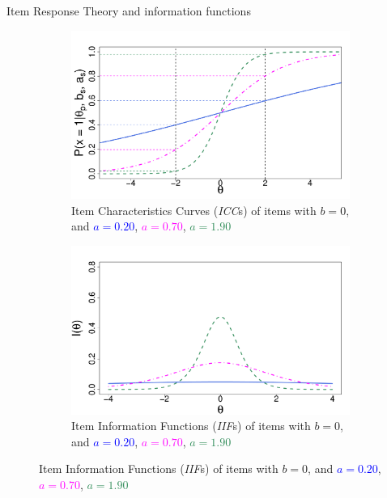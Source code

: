 \documentclass[final,t]{beamer}
\begin{document}
\begin{frame}
\begin{columns}[t]
\begin{column}{.45\linewidth}
\begin{block}{\centering Item Response Theory and information functions}
	\begin{figure}
		\centering
		\begin{subfigure}{.45\linewidth}
			\includegraphics[width=\linewidth]{img/bs.pdf}
			\caption{Item Characteristics Curves (\emph{ICC}s) of items with $b=0$, and \textcolor{blue}{$a = 0.20$}, \textcolor{magenta}{$a = 0.70$}, 
				\textcolor{seagreen}{$a = 1.90$}}
			\label{sub:icc}
		\end{subfigure}
		\begin{subfigure}{.45\linewidth}
			\includegraphics[width=\linewidth]{img/iifs.pdf}
			\caption{Item Information Functions (\emph{IIF}s) of items with $b=0$, and \textcolor{blue}{$a = 0.20$}, \textcolor{magenta}{$a = 0.70$}, 
				\textcolor{seagreen}{$a = 1.90$}}
			\label{sub:iif}
		\end{subfigure}
		

\end{figure}
\end{block}
\end{column}
\end{columns}
\end{frame}
\end{document}
